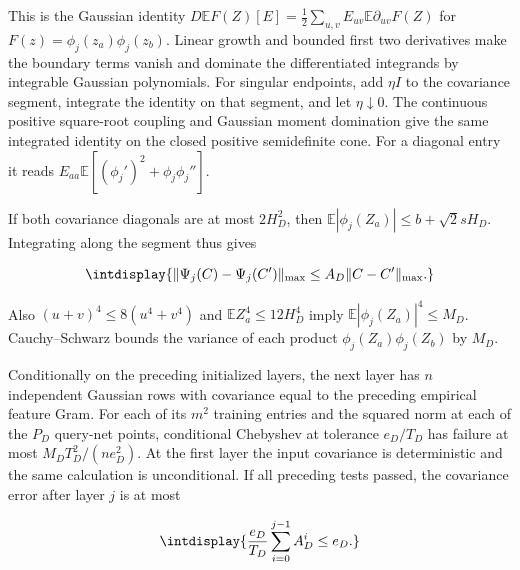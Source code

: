 This is the Gaussian identity \(D\mathbb E F(Z)[E]=\frac12\sum_{u,\allowbreak v}E_{uv} \mathbb E\partial_{uv}F(Z)\) for \(F(z)=\phi_j(z_a)\phi_j(z_b)\). Linear growth and bounded first two derivatives make the boundary terms vanish and dominate the differentiated integrands by integrable Gaussian polynomials. For singular endpoints, add \(\eta I\) to the covariance segment, integrate the identity on that segment, and let \(\eta\downarrow0\). The continuous positive square-root coupling and Gaussian moment domination give the same integrated identity on the closed positive semidefinite cone. For a diagonal entry it reads \(E_{aa}\mathbb E[(\phi_j')^2+\phi_j\phi_j'']\).



If both covariance diagonals are at most \(2H_D^2\), then \(\mathbb E|\phi_j(Z_a)|\le b+\sqrt2sH_D\). Integrating along the segment thus gives


\begingroup\renewcommand{\theHequation}{intdisplay.441}
\begin{equation*}
\intdisplay{
\|\Psi_j(C)-\Psi_j(C')\|_{\max}
\le A_D\|C-C'\|_{\max}.
}
\end{equation*}
\endgroup


Also \((u+v)^4\le8(u^4+v^4)\) and \(\mathbb E Z_a^4\le12H_D^4\) imply \(\mathbb E|\phi_j(Z_a)|^4\le M_D\). Cauchy--Schwarz bounds the variance of each product \(\phi_j(Z_a)\phi_j(Z_b)\) by \(M_D\).



Conditionally on the preceding initialized layers, the next layer has \(n\) independent Gaussian rows with covariance equal to the preceding empirical feature Gram. For each of its \(m^2\) training entries and the squared norm at each of the \(P_D\) query-net points, conditional Chebyshev at tolerance \(e_D/T_D\) has failure at most \(M_DT_D^2/(ne_D^2)\). At the first layer the input covariance is deterministic and the same calculation is unconditional. If all preceding tests passed, the covariance error after layer \(j\) is at most


\begingroup\renewcommand{\theHequation}{intdisplay.442}
\begin{equation*}
\intdisplay{
\frac{e_D}{T_D}\sum_{i=0}^{j-1}A_D^i\le e_D.
}
\end{equation*}
\endgroup



